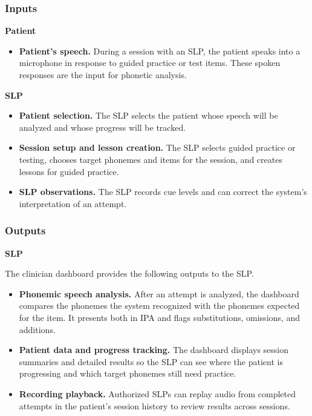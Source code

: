 \documentclass{article}
\begin{document}
\subsubsection{Inputs}

\textbf{Patient}

\begin{itemize}
    \item \textbf{Patient's speech.} During a session with an SLP, the patient
      speaks into a microphone in response to guided practice or test items.
      These spoken responses are the input for phonetic analysis.
\end{itemize}

\noindent\textbf{SLP}

\begin{itemize}
    \item \textbf{Patient selection.} The SLP selects the patient whose
      speech will be analyzed and whose progress will be tracked.
    \item \textbf{Session setup and lesson creation.} The SLP selects guided
      practice or testing, chooses target phonemes and items for the session,
      and creates lessons for guided practice.
    \item \textbf{SLP observations.} The SLP records cue levels and can correct
      the system's interpretation of an attempt.
\end{itemize}

\subsubsection{Outputs}

\textbf{SLP}

The clinician dashboard provides the following outputs to the SLP.

\begin{itemize}
    \item \textbf{Phonemic speech analysis.} After an attempt is analyzed, the
      dashboard compares the phonemes the system recognized with the phonemes
      expected for the item. It presents both in IPA and flags substitutions,
      omissions, and additions.
    \item \textbf{Patient data and progress tracking.} The dashboard displays
      session summaries and detailed results so the SLP can see where the
      patient is progressing and which target phonemes still need practice.
    \item \textbf{Recording playback.} Authorized SLPs can replay audio from
      completed attempts in the patient's session history to review results
      across sessions.
\end{itemize}
\end{document}
